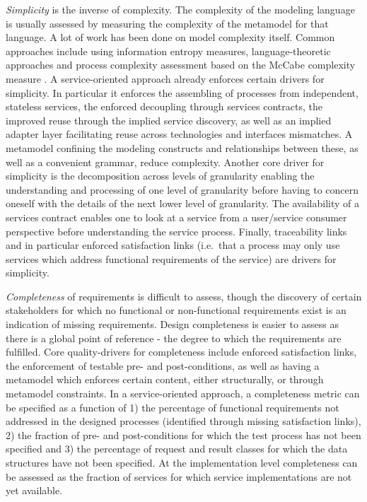 \emph{Simplicity} is the inverse of complexity. The complexity of the modeling language is usually assessed by measuring the complexity of the metamodel for that language\cite{mohagheghi_evaluating_2007}. A lot of work has been done on model complexity itself. Common approaches include using information entropy measures\cite{abrahamsson_extreme_2004}, language-theoretic approaches\cite{podgorelec_estimating_2007} and process complexity assessment based on the McCabe complexity measure \cite{mccabe_complexity_1976}. A service-oriented approach already enforces certain drivers for simplicity. In particular it enforces the assembling of processes from independent, stateless services, the enforced decoupling through services contracts, the improved reuse through the implied service discovery, as well as an implied adapter layer facilitating reuse across technologies and interfaces mismatches. A metamodel confining the modeling constructs and relationships between these, as well as a convenient grammar, reduce complexity. Another core driver for simplicity is the decomposition across levels of granularity enabling the understanding and processing of one level of granularity before having to concern oneself with the details of the next lower level of granularity. The availability of a services contract enables one to look at a service from a user/service consumer perspective before understanding the service process. Finally, traceability links and in particular enforced satisfaction links (i.e.\ that a process may only use services which address functional requirements of the service) are drivers for simplicity.

\emph{Completeness} of requirements is difficult to assess, though the discovery of certain stakeholders for which no functional or non-functional requirements exist is an indication of missing requirements. Design completeness is easier to assess as there is a global point of reference - the degree to which the requirements are fulfilled. Core quality-drivers for completeness include enforced satisfaction links, the enforcement of testable pre- and post-conditions, as well as having a metamodel which enforces certain content, either structurally, or through metamodel constraints. In a service-oriented approach, a completeness metric can be specified as a function of 1) the percentage of functional requirements not addressed in the designed processes (identified through missing satisfaction links)\cite{shim_design_2008}, 2) the fraction of pre- and post-conditions for which the test process has not been specified and 3) the percentage of request and result classes for which the data structures have not been specified. At the implementation level completeness can be assessed as the fraction of services for which service implementations are not yet available.

